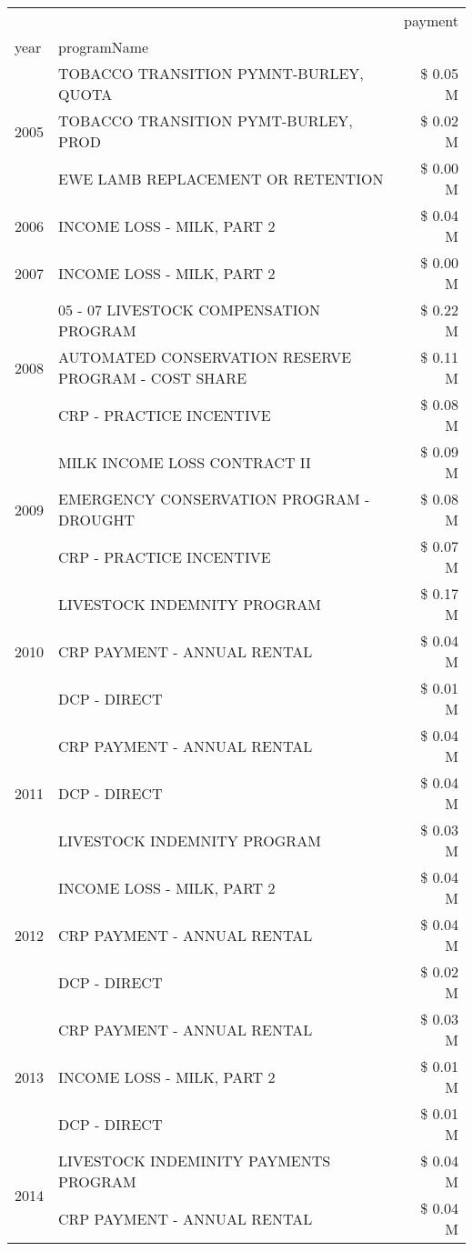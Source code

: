 \begin{tabular}{llr}
\toprule
 &  & payment \\
year & programName &  \\
\midrule
\multirow[t]{3}{*}{2005} & TOBACCO TRANSITION PYMNT-BURLEY, QUOTA & \$ 0.05 M \\
 & TOBACCO TRANSITION PYMT-BURLEY, PROD & \$ 0.02 M \\
 & EWE LAMB REPLACEMENT OR RETENTION & \$ 0.00 M \\
\cline{1-3}
2006 & INCOME LOSS - MILK, PART 2 & \$ 0.04 M \\
\cline{1-3}
2007 & INCOME LOSS - MILK, PART 2 & \$ 0.00 M \\
\cline{1-3}
\multirow[t]{3}{*}{2008} & 05 - 07 LIVESTOCK COMPENSATION PROGRAM & \$ 0.22 M \\
 & AUTOMATED CONSERVATION RESERVE PROGRAM - COST SHARE & \$ 0.11 M \\
 & CRP - PRACTICE INCENTIVE & \$ 0.08 M \\
\cline{1-3}
\multirow[t]{3}{*}{2009} & MILK INCOME LOSS CONTRACT II & \$ 0.09 M \\
 & EMERGENCY CONSERVATION PROGRAM - DROUGHT & \$ 0.08 M \\
 & CRP - PRACTICE INCENTIVE & \$ 0.07 M \\
\cline{1-3}
\multirow[t]{3}{*}{2010} & LIVESTOCK INDEMNITY PROGRAM & \$ 0.17 M \\
 & CRP PAYMENT - ANNUAL RENTAL & \$ 0.04 M \\
 & DCP - DIRECT & \$ 0.01 M \\
\cline{1-3}
\multirow[t]{3}{*}{2011} & CRP PAYMENT - ANNUAL RENTAL & \$ 0.04 M \\
 & DCP - DIRECT & \$ 0.04 M \\
 & LIVESTOCK INDEMNITY PROGRAM & \$ 0.03 M \\
\cline{1-3}
\multirow[t]{3}{*}{2012} & INCOME LOSS - MILK, PART 2 & \$ 0.04 M \\
 & CRP PAYMENT - ANNUAL RENTAL & \$ 0.04 M \\
 & DCP - DIRECT & \$ 0.02 M \\
\cline{1-3}
\multirow[t]{3}{*}{2013} & CRP PAYMENT - ANNUAL RENTAL & \$ 0.03 M \\
 & INCOME LOSS - MILK, PART 2 & \$ 0.01 M \\
 & DCP - DIRECT & \$ 0.01 M \\
\cline{1-3}
\multirow[t]{3}{*}{2014} & LIVESTOCK INDEMINITY PAYMENTS PROGRAM & \$ 0.04 M \\
 & CRP PAYMENT - ANNUAL RENTAL & \$ 0.04 M \\

\end{tabular}
